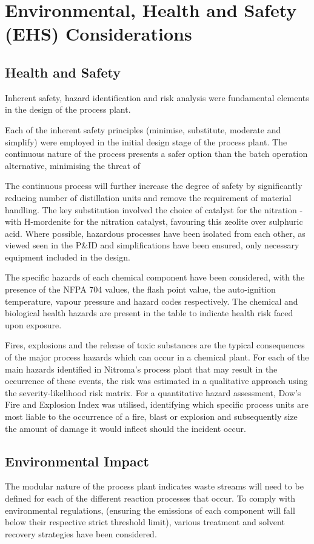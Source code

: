 \section{Environmental, Health and Safety (EHS) Considerations}
\label{sec:ehs}
\subsection{Health and Safety}

Inherent safety, hazard identification and risk analysis were fundamental elements in the design of the process plant. 

Each of the inherent safety principles (minimise, substitute, moderate and simplify) were employed in the initial design stage of the process plant. The continuous nature of the process presents a safer option than the batch operation alternative, minimising the threat of %

The continuous process will further increase the degree of safety by significantly reducing number of distillation units and remove the requirement of material handling. The key substitution involved the choice of catalyst for the nitration - with H-mordenite for the nitration catalyst, favouring this zeolite over sulphuric acid. Where possible, hazardous processes have been isolated from each other, as viewed seen in the P&ID and simplifications have been ensured, only necessary equipment included in the design.

The specific hazards of each chemical component have been considered, with the presence of the NFPA 704 values, the flash point value, the auto-ignition temperature, vapour pressure and hazard codes respectively. The chemical and biological health hazards are present in the table to indicate health risk faced upon exposure.  

Fires, explosions and the release of toxic substances are the typical consequences of the major process hazards which can occur in a chemical plant.  %
For each of the main hazards identified in Nitroma's process plant that may result in the occurrence of these events, the risk was estimated in a qualitative approach using the severity-likelihood risk matrix. For a quantitative hazard assessment, Dow's Fire and Explosion Index was utilised, identifying which specific process units are most liable to the occurrence of a fire, blast or explosion and subsequently size the amount of damage it would inflect should the incident occur. 



\subsection{Environmental Impact}

The modular nature of the process plant indicates waste streams will need to be defined for each of the different reaction processes that occur. To comply with environmental regulations, (ensuring the emissions of each component will fall below their respective strict threshold limit), various treatment and solvent recovery strategies have been considered. 